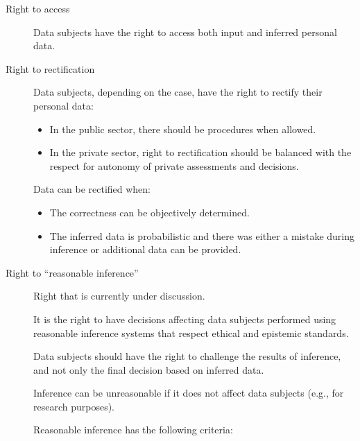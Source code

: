 \begin{description}
    \item[Right to access] 
        Data subjects have the right to access both input and inferred personal data. 

    \item[Right to rectification] 
        Data subjects, depending on the case, have the right to rectify their personal data:
        \begin{itemize}
            \item In the public sector, there should be procedures when allowed.
            \item In the private sector, right to rectification should be balanced with the respect for autonomy of private assessments and decisions.
        \end{itemize}

        Data can be rectified when:
        \begin{itemize}
            \item The correctness can be objectively determined.
            \item The inferred data is probabilistic and there was either a mistake during inference or additional data can be provided. 
        \end{itemize}

    \item[Right to ``reasonable inference''] 
        Right that is currently under discussion.

        It is the right to have decisions affecting data subjects performed using reasonable inference systems that respect ethical and epistemic standards.

        \begin{remark}
            Data subjects should have the right to challenge the results of inference, and not only the final decision based on inferred data.
        \end{remark}

        \begin{remark}
            Inference can be unreasonable if it does not affect data subjects (e.g., for research purposes).
        \end{remark}

        Reasonable inference has the following criteria:
\end{description}
